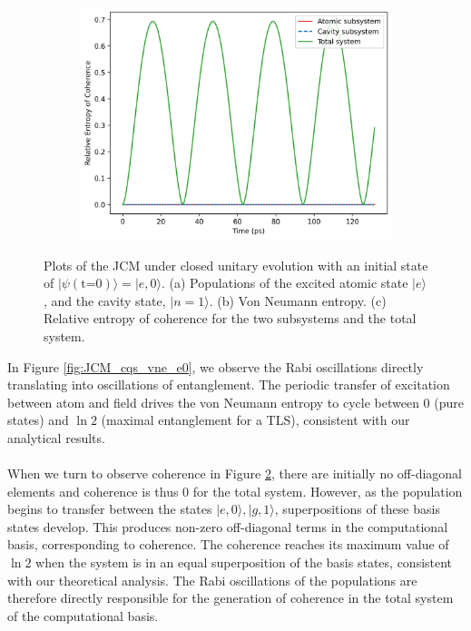 \documentclass[11pt]{article}
\begin{document}
\begin{figure}[H]
        \vspace{0.5cm}
    
    \begin{subfigure}{0.45\textwidth}
        \centering
        \includegraphics[width=\linewidth]{Research Project/Code/results/JCM/CQS_coh.png}
        \caption{}
        \label{fig:JCM_cqs_coh_e0}
    \end{subfigure}
    \hfill
    \caption{Plots of the JCM under closed unitary evolution with an initial state of $|\psi (\text{t=0})\rangle = |e, 0\rangle$. (a) Populations of the excited atomic state $|e\rangle$, and the cavity state, $|n=1\rangle$. (b) Von Neumann entropy. (c) Relative entropy of coherence for the two subsystems and the total system.}
\end{figure}

\noindent In Figure \ref{fig:JCM_cqs_vne_e0}, we observe the Rabi oscillations directly translating into oscillations of entanglement. The periodic transfer of excitation between atom and field drives the von Neumann entropy to cycle between 0 (pure states) and $\ln 2$ (maximal entanglement for a TLS), consistent with our analytical results.\\
\\
When we turn to observe coherence in Figure \ref{fig:JCM_cqs_coh_e0}, there are initially no off-diagonal elements and coherence is thus 0 for the total system. However, as the population begins to transfer between the states $|e,0\rangle,|g,1\rangle$, superpositions of these basis states develop. This produces non-zero off-diagonal terms in the computational basis, corresponding to coherence. The coherence reaches its maximum value of $\ln2$ when the system is in an equal superposition of the basis states, consistent with our theoretical analysis. The Rabi oscillations of the populations are therefore directly responsible for the generation of coherence in the total system of the computational basis. 
\end{document}
